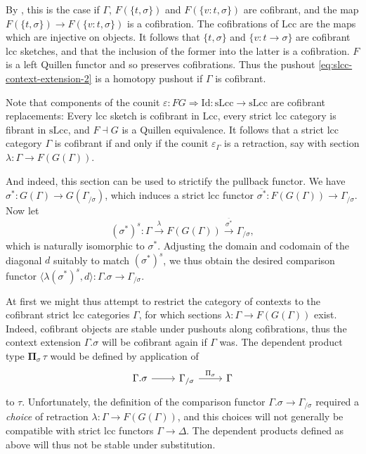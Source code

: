 \documentclass[a4paper]{article}
\theoremstyle{remark}
\theoremstyle{definition}
\begin{document}
By \cite[Proposition A.2.4.4]{higher-topos-theory}, this is the case if $\Gamma$, $F(\{t, \sigma\})$ and $F(\{v : t, \sigma\})$ are cofibrant, and the map $F(\{t, \sigma\}) \rightarrow F(\{v : t, \sigma\})$ is a cofibration.
The cofibrations of $\mathrm{Lcc}$ are the maps which are injective on objects.
It follows that $\{t, \sigma\}$ and $\{ v : t \rightarrow \sigma\}$ are cofibrant lcc sketches, and that the inclusion of the former into the latter is a cofibration.
$F$ is a left Quillen functor and so preserves cofibrations.
Thus the pushout \eqref{eq:slcc-context-extension-2} is a homotopy pushout if $\Gamma$ is cofibrant.

Note that components of the counit $\varepsilon : FG \Rightarrow \mathrm{Id} : \mathrm{sLcc} \rightarrow \mathrm{sLcc}$ are cofibrant replacements:
Every lcc sketch is cofibrant in $\mathrm{Lcc}$, every strict lcc category is fibrant in $\mathrm{sLcc}$, and $F \dashv G$ is a Quillen equivalence.
It follows that a strict lcc category $\Gamma$ is cofibrant if and only if the counit $\varepsilon_\Gamma$ is a retraction, say with section $\lambda : \Gamma \rightarrow F(G(\Gamma))$.

And indeed, this section can be used to strictify the pullback functor.
We have $\sigma^* : G(\Gamma) \rightarrow G(\Gamma_{/ \sigma})$, which induces a strict lcc functor $\overline{\sigma^*} : F(G(\Gamma)) \rightarrow \Gamma_{/ \sigma}$.
Now let
\begin{equation}
  (\sigma^*)^s : \Gamma \xrightarrow{\lambda} F(G(\Gamma)) \xrightarrow{\overline{\sigma^*}} \Gamma_{/ \sigma},
\end{equation}
which is naturally isomorphic to $\sigma^*$.
Adjusting the domain and codomain of the diagonal $d$ suitably to match $(\sigma^*)^s$, we thus obtain the desired comparison functor $\langle \lambda (\sigma^*)^s, d \rangle : \Gamma.\sigma \rightarrow \Gamma_{/ \sigma}$.

At first we might thus attempt to restrict the category of contexts to the cofibrant strict lcc categories $\Gamma$, for which sections $\lambda : \Gamma \rightarrow F(G(\Gamma))$ exist.
Indeed, cofibrant objects are stable under pushouts along cofibrations, thus the context extension $\Gamma.\sigma$ will be cofibrant again if $\Gamma$ was.
The dependent product type $\mathbf{\Pi}_\sigma \, \tau$ would be defined by application of
\begin{equation}
  \begin{tikzcd}
    \Gamma.\sigma \arrow[r] & \Gamma_{/ \sigma} \arrow[r, "\Pi_\sigma"] & \Gamma
  \end{tikzcd}
\end{equation}
to $\tau$.
Unfortunately, the definition of the comparison functor $\Gamma.\sigma \rightarrow \Gamma_{/ \sigma}$ required a \emph{choice} of retraction $\lambda : \Gamma \rightarrow F(G(\Gamma))$, and this choices will not generally be compatible with strict lcc functors $\Gamma \rightarrow \Delta$.
The dependent products defined as above will thus not be stable under substitution.
\end{document}
